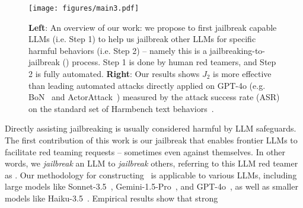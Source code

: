 
\begin{figure}[t]
    \centering
    \texttt{[image: figures/main3.pdf]}
    \caption{\textbf{Left}: An overview of our work: we propose to first jailbreak capable LLMs (i.e. Step 1) to help us jailbreak other LLMs for specific harmful behaviors (i.e. Step 2) -- namely this is a jailbreaking-to-jailbreak (\methodname) process. Step 1 is done by human red teamers, and Step 2 is fully automated. \textbf{Right}: Our results shows $J_2$ is more effective than leading automated attacks directly applied on GPT-4o (e.g. BoN~\cite{hughes2024bestofnjailbreaking} and ActorAttack~\cite{ren2024derailyourselfmultiturnllm}) measured by the attack success rate (ASR) on the standard set of Harmbench text behaviors~\cite{mazeika2024harmbench}.}
    \label{fig:main}
\end{figure}


Directly assisting jailbreaking is usually considered harmful by LLM safeguards. The first contribution of this work is our jailbreak that enables frontier LLMs to facilitate red teaming requests -- sometimes even against themselves. In other words, we \emph{jailbreak} an LLM to \emph{jailbreak} others, referring to this LLM red teamer as \methodname. Our methodology for constructing \methodname~is applicable to various LLMs, including large models like Sonnet-3.5~\citep{Anthropic}, Gemini-1.5-Pro~\citep{geminiteam2024geminifamilyhighlycapable}, and GPT-4o~\citep{openai2024gpt4ocard}, as well as smaller models like Haiku-3.5~\citep{Anthropic}. Empirical results show that strong  


